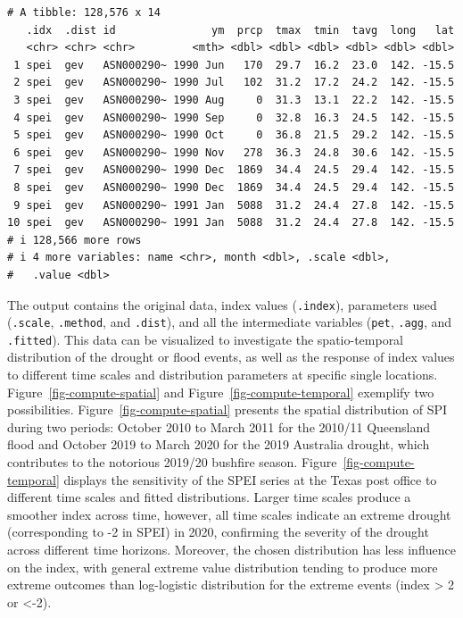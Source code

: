 \documentclass[
]{interact}
\begin{document}
\begin{verbatim}
# A tibble: 128,576 x 14
   .idx  .dist id               ym  prcp  tmax  tmin  tavg  long   lat
   <chr> <chr> <chr>         <mth> <dbl> <dbl> <dbl> <dbl> <dbl> <dbl>
 1 spei  gev   ASN000290~ 1990 Jun   170  29.7  16.2  23.0  142. -15.5
 2 spei  gev   ASN000290~ 1990 Jul   102  31.2  17.2  24.2  142. -15.5
 3 spei  gev   ASN000290~ 1990 Aug     0  31.3  13.1  22.2  142. -15.5
 4 spei  gev   ASN000290~ 1990 Sep     0  32.8  16.3  24.5  142. -15.5
 5 spei  gev   ASN000290~ 1990 Oct     0  36.8  21.5  29.2  142. -15.5
 6 spei  gev   ASN000290~ 1990 Nov   278  36.3  24.8  30.6  142. -15.5
 7 spei  gev   ASN000290~ 1990 Dec  1869  34.4  24.5  29.4  142. -15.5
 8 spei  gev   ASN000290~ 1990 Dec  1869  34.4  24.5  29.4  142. -15.5
 9 spei  gev   ASN000290~ 1991 Jan  5088  31.2  24.4  27.8  142. -15.5
10 spei  gev   ASN000290~ 1991 Jan  5088  31.2  24.4  27.8  142. -15.5
# i 128,566 more rows
# i 4 more variables: name <chr>, month <dbl>, .scale <dbl>,
#   .value <dbl>
\end{verbatim}

The output contains the original data, index values (\texttt{.index}),
parameters used (\texttt{.scale}, \texttt{.method}, and \texttt{.dist}),
and all the intermediate variables (\texttt{pet}, \texttt{.agg}, and
\texttt{.fitted}). This data can be visualized to investigate the
spatio-temporal distribution of the drought or flood events, as well as
the response of index values to different time scales and distribution
parameters at specific single locations.
Figure~\ref{fig-compute-spatial} and Figure~\ref{fig-compute-temporal}
exemplify two possibilities. Figure~\ref{fig-compute-spatial} presents
the spatial distribution of SPI during two periods: October 2010 to
March 2011 for the 2010/11 Queensland flood and October 2019 to March
2020 for the 2019 Australia drought, which contributes to the notorious
2019/20 bushfire season. Figure~\ref{fig-compute-temporal} displays the
sensitivity of the SPEI series at the Texas post office to different
time scales and fitted distributions. Larger time scales produce a
smoother index across time, however, all time scales indicate an extreme
drought (corresponding to -2 in SPEI) in 2020, confirming the severity
of the drought across different time horizons. Moreover, the chosen
distribution has less influence on the index, with general extreme value
distribution tending to produce more extreme outcomes than log-logistic
distribution for the extreme events (index \textgreater{} 2 or
\textless-2).
\end{document}
